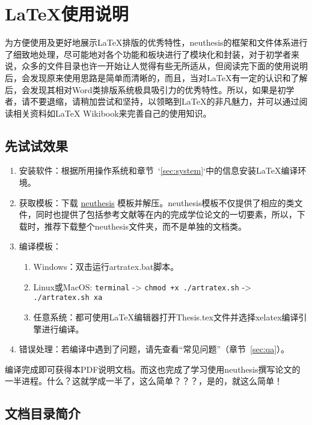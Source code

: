 \chapter{LaTeX使用说明}\label{chap:guide}

为方便使用及更好地展示LaTeX排版的优秀特性，neuthesis的框架和文件体系进行了细致地处理，尽可能地对各个功能和板块进行了模块化和封装，对于初学者来说，众多的文件目录也许一开始让人觉得有些无所适从，但阅读完下面的使用说明后，会发现原来使用思路是简单而清晰的，而且，当对LaTeX有一定的认识和了解后，会发现其相对Word类排版系统极具吸引力的优秀特性。所以，如果是初学者，请不要退缩，请稍加尝试和坚持，以领略到LaTeX的非凡魅力，并可以通过阅读相关资料如LaTeX Wikibook\cite{wikibook2014latex}来完善自己的使用知识。

\section{先试试效果}

\begin{enumerate}
    \item 安装软件：根据所用操作系统和章节~`\ref{sec:system}`中的信息安装LaTeX编译环境。
    \item 获取模板：下载 \href{https://github.com/mervin0502/neuthesis}{neuthesis} 模板并解压。neuthesis模板不仅提供了相应的类文件，同时也提供了包括参考文献等在内的完成学位论文的一切要素，所以，下载时，推荐下载整个neuthesis文件夹，而不是单独的文档类。
    \item 编译模板：
        \begin{enumerate}
            \item Windows：双击运行artratex.bat脚本。
            \item Linux或MacOS: {\scriptsize \verb|terminal| -> \verb|chmod +x ./artratex.sh| -> \verb|./artratex.sh xa|}
            \item 任意系统：都可使用LaTeX编辑器打开Thesis.tex文件并选择xelatex编译引擎进行编译。
        \end{enumerate}
    \item 错误处理：若编译中遇到了问题，请先查看“常见问题”（章节~\ref{sec:qa}）。
\end{enumerate}

编译完成即可获得本PDF说明文档。而这也完成了学习使用neuthesis撰写论文的一半进程。什么？这就学成一半了，这么简单？？？，是的，就这么简单！

\section{文档目录简介}

